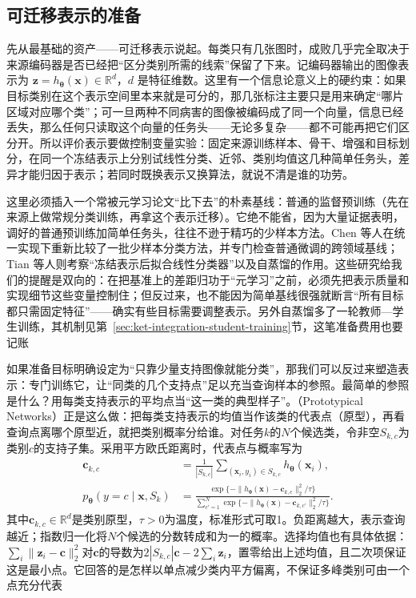 \subsection{可迁移表示的准备}
\label{sec:ket-transfer-representation}

先从最基础的资产——可迁移表示说起。每类只有几张图时，成败几乎完全取决于来源编码器是否已经把“区分类别所需的线索”保留了下来。记编码器输出的图像表示为 $\bm z=h_{\bm\theta}(\bm x)\in\mathbb R^d$，$d$ 是特征维数。这里有一个信息论意义上的硬约束：如果目标类别在这个表示空间里本来就是可分的，那几张标注主要只是用来确定“哪片区域对应哪个类”；可一旦两种不同病害的图像被编码成了同一个向量，信息已经丢失，那么任何只读取这个向量的任务头——无论多复杂——都不可能再把它们区分开。所以评价表示要做控制变量实验：固定来源训练样本、骨干、增强和目标划分，在同一个冻结表示上分别试线性分类、近邻、类别均值这几种简单任务头，差异才能归因于表示；若同时既换表示又换算法，就说不清是谁的功劳。

这里必须插入一个常被元学习论文“比下去”的朴素基线：普通的监督预训练（先在来源上做常规分类训练，再拿这个表示迁移）。它绝不能省，因为大量证据表明，调好的普通预训练加简单任务头，往往不逊于精巧的少样本方法。Chen 等人在统一实现下重新比较了一批少样本分类方法，并专门检查普通微调的跨领域基线；Tian 等人则考察“冻结表示后拟合线性分类器”以及自蒸馏的作用。这些研究给我们的提醒是双向的：在把基准上的差距归功于“元学习”之前，必须先把表示质量和实现细节这些变量控制住；但反过来，也不能因为简单基线很强就断言“所有目标都只需固定特征”——确实有些目标需要调整表示。另外自蒸馏多了一轮教师—学生训练，其机制见第~\ref{sec:ket-integration-student-training}节，这笔准备费用也要记账

如果准备目标明确设定为“只靠少量支持图像就能分类”，那我们可以反过来塑造表示：专门训练它，让“同类的几个支持点”足以充当查询样本的参照。最简单的参照是什么？用每类支持表示的平均点当“这一类的典型样子”。（Prototypical Networks）正是这么做：把每类支持表示的均值当作该类的代表点（原型），再看查询点离哪个原型近，就把类别概率分给谁。对任务$k$的$N$个候选类，令非空$S_{k,c}$为类别$c$的支持子集。采用平方欧氏距离时，代表点与概率写为
\begin{align}
  \bm c_{k,c}
  &=\frac{1}{|S_{k,c}|}
    \sum_{(\bm x_i,y_i)\in S_{k,c}}h_{\bm{\theta}}(\bm x_i),
    \label{eq:ket-transfer-prototype}\\
  p_{\bm{\theta}}(y=c\mid\bm x,S_k)
  &=\frac{\exp\{-\|h_{\bm{\theta}}(\bm x)-\bm c_{k,c}\|_2^2/\tau\}}
    {\sum_{c'=1}^{N}\exp\{-\|h_{\bm{\theta}}(\bm x)-\bm c_{k,c'}\|_2^2/\tau\}}.
    \label{eq:ket-transfer-prototype-probability}
\end{align}
其中$\bm c_{k,c}\in\mathbb R^d$是类别原型，$\tau>0$为温度，标准形式可取1。负距离越大，表示查询越近；指数归一化将$N$个候选的分数转成和为一的概率。选择均值也有具体依据：$\sum_i\|\bm z_i-\bm c\|_2^2$对$\bm c$的导数为$2|S_{k,c}|\bm c-2\sum_i\bm z_i$，置零给出上述均值，且二次项保证这是最小点。它回答的是怎样以单点减少类内平方偏离，不保证多峰类别可由一个点充分代表

